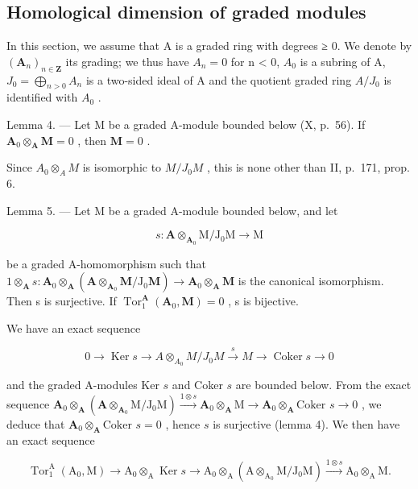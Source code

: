\subsection{Homological dimension of graded modules}

In this section, we assume that A is a graded ring with degrees ≥ 0. We denote by \((\mathbf{A}_{n})_{n \in \mathbf{Z}}\) its grading; we thus have \(A_{n} = 0\) for n \textless{} 0, \(A_{0}\) is a subring of A, \(J_{0} = \bigoplus_{n > 0} A_{n}\) is a two-sided ideal of A and the quotient graded ring \(A/J_{0}\) is identified with \(A_{0}\) .

Lemma 4. --- Let M be a graded A-module bounded below (X, p.~56). If \(\mathbf{A}_0\otimes_{\mathbf{A}}\mathbf{M} = 0\) , then \(\mathbf{M} = 0\) .

Since \(A_{0} \otimes_{A} M\) is isomorphic to \(M/J_{0} M\) , this is none other than II, p.~171, prop. 6.

Lemma 5. --- Let M be a graded A-module bounded below, and let

\[
s: \mathbf {A} \otimes_ {\mathbf {A} _ {0}} \mathrm{M} / \mathrm{J} _ {0} \mathrm{M} \rightarrow \mathrm{M}
\]

be a graded A-homomorphism such that \(1 \otimes_{\mathbf{A}} s: \mathbf{A}_0 \otimes_{\mathbf{A}} (\mathbf{A} \otimes_{\mathbf{A}_0} \mathbf{M} / \mathrm{J}_0 \mathbf{M}) \to \mathbf{A}_0 \otimes_{\mathbf{A}} \mathbf{M}\) is the canonical isomorphism. Then s is surjective. If \(\operatorname{Tor}_1^{\mathbf{A}}(\mathbf{A}_0, \mathbf{M}) = 0\) , s is bijective.

We have an exact sequence

\[
0 \rightarrow \operatorname{Ker} s \rightarrow A \otimes_ {A _ {0}} M / J _ {0} M \xrightarrow {s} M \rightarrow \operatorname{Coker} s \rightarrow 0
\]

and the graded A-modules Ker \(s\) and Coker \(s\) are bounded below. From the exact sequence \(\mathbf{A}_{0} \otimes_{\mathbf{A}} (\mathbf{A} \otimes_{\mathbf{A}_{0}} \mathrm{M} / \mathrm{J}_{0} \mathrm{M}) \xrightarrow{1 \otimes s} \mathbf{A}_{0} \otimes_{\mathbf{A}} \mathrm{M} \to \mathbf{A}_{0} \otimes_{\mathbf{A}} \text{Coker } s \to 0\) , we deduce that \(\mathbf{A}_{0} \otimes_{\mathbf{A}} \text{Coker } s = 0\) , hence \(s\) is surjective (lemma 4). We then have an exact sequence

\[
\operatorname{Tor} _ {1} ^ {\mathrm{A}} \left(\mathrm{A} _ {0}, \mathrm{M}\right)\rightarrow \mathrm{A} _ {0} \otimes_ {\mathrm{A}} \operatorname{Ker} s \rightarrow \mathrm{A} _ {0} \otimes_ {\mathrm{A}} \left(\mathrm{A} \otimes_ {\mathrm{A} _ {0}} \mathrm{M} / \mathrm{J} _ {0} \mathrm{M}\right) \xrightarrow {1 \otimes s} \mathrm{A} _ {0} \otimes_ {\mathrm{A}} \mathrm{M}.
\]

